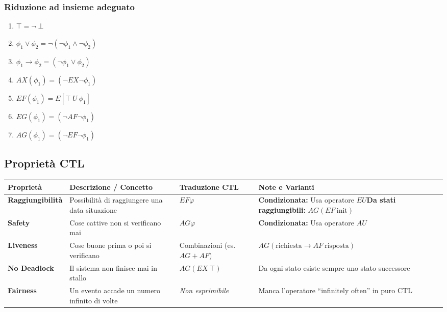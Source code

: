 \documentclass{article}
\begin{document}
\subsubsection*{Riduzione ad insieme adeguato}
\begin{enumerate}
    \item $\top = \neg\perp$
    \item $\phi_1 \lor \phi_2 = \neg(\neg\phi_1 \land \neg\phi_2)$
    \item $\phi_1 \rightarrow \phi_2 = (\neg\phi_1 \lor \phi_2)$
    \item $AX(\phi_1) = (\neg EX\neg\phi_1)$
    \item $EF(\phi_1) = E[\top \ U \ \phi_1]$
    \item $EG(\phi_1) = (\neg AF\neg\phi_1)$
    \item $AG(\phi_1) = (\neg EF\neg\phi_1)$
\end{enumerate}

\subsection*{Proprietà CTL}

\begin{table}[H]
\centering
\begin{tabular}{|p{3cm}|p{4.5cm}|p{3.5cm}|p{4cm}|}
\hline
\textbf{Proprietà} & \textbf{Descrizione / Concetto} & \textbf{Traduzione CTL} & \textbf{Note e Varianti} \\ \hline
\textbf{Raggiungibilità} & Possibilità di raggiungere una data situazione & $EF \varphi$ & \textbf{Condizionata:} Usa operatore $EU$\newline \textbf{Da stati raggiungibili:} $AG(EF \ \text{init})$ \\ \hline
\textbf{Safety} & Cose cattive non si verificano mai & $AG \varphi$ & \textbf{Condizionata:} Usa operatore $AU$ \\ \hline
\textbf{Liveness} & Cose buone prima o poi si verificano & Combinazioni (es. $AG + AF$) & $AG(\text{richiesta} \to AF \ \text{risposta})$ \\ \hline
\textbf{No Deadlock} & Il sistema non finisce mai in stallo & $AG(EX \ \top)$ & Da ogni stato esiste sempre uno stato successore \\ \hline
\textbf{Fairness} & Un evento accade un numero infinito di volte & \textit{Non esprimibile} & Manca l'operatore ``infinitely often'' in puro CTL \\ \hline
\end{tabular}
\end{table}
\end{document}
